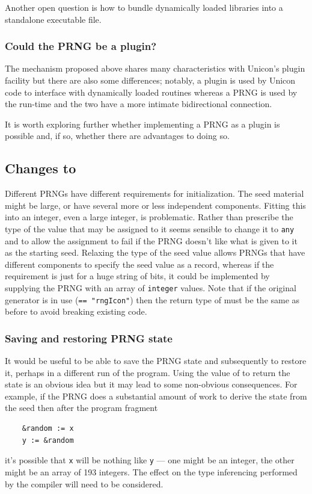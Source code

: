 \documentclass[letterpaper,12pt]{article}
\begin{document}
Another open question is how to bundle dynamically loaded libraries into a
standalone executable file.

\subsubsection{Could the PRNG be a plugin?}
The mechanism proposed above shares many characteristics with Unicon's
plugin facility but there are also some differences; notably, a plugin is
used by Unicon code to interface with dynamically loaded routines whereas a
PRNG is used by the run-time and the two have a more intimate bidirectional
connection.

It is worth exploring further whether implementing a PRNG as a plugin is
possible and, if so, whether there are advantages to doing so.

\subsection{Changes to \rndkwd}
Different PRNGs have different requirements for initialization. The seed
material might be large, or have several more or less independent
components. Fitting this into an integer, even a large integer, is
problematic. Rather than prescribe the type of the value that may be
assigned to \rndkwd it seems sensible to change it to \texttt{any} and to
allow the assignment to fail if the PRNG doesn't like what is given to it
as the starting seed. Relaxing the type of the seed value allows PRNGs that
have different components to specify the seed value as a record, whereas if
the requirement is just for a huge string of bits, it could be implemented
by supplying the PRNG with an array of \texttt{integer} values.
Note that if the original generator is in use (\rndlibkwd \verb/== "rngIcon"/)
then the return type of \rndkwd must be the same as before to avoid
breaking existing code.

\subsubsection{Saving and restoring PRNG state}
It would be useful to be able to save the PRNG state and subsequently to
restore it, perhaps in a different run of the program. Using the value of
\rndkwd to return the state is an obvious idea but it may lead to some
non-obvious consequences. For example, if the PRNG does a substantial
amount of work to derive the state from the seed then after the program
fragment
\begin{verbatim}
    &random := x
    y := &random
\end{verbatim}
it's possible that \verb/x/ will be nothing like \verb/y/ --- one
might be an integer, the other might be an array of 193 integers. The
effect on the type inferencing performed by the compiler will
need to be considered.
\end{document}
